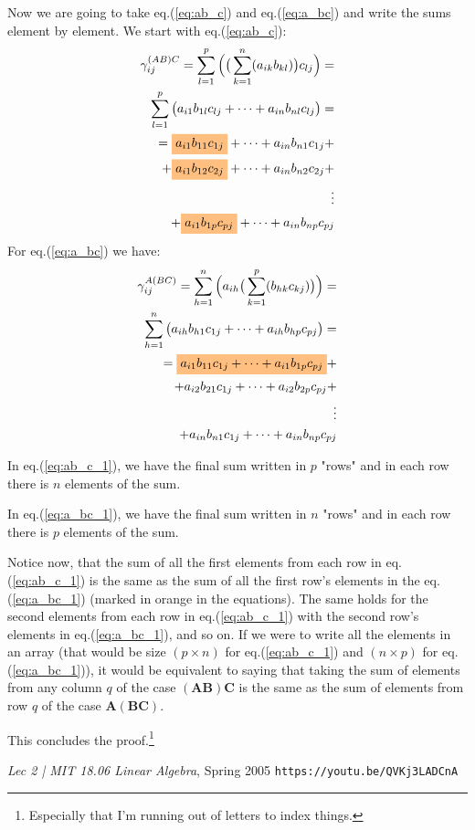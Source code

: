 \documentclass[10pt,twocolumn]{article}
\newcommand{\highlight}[1]{%
  \colorbox{orange!50}{$\displaystyle#1$}}
\begin{document}
Now we are going to take eq.(\ref{eq:ab_c}) and eq.(\ref{eq:a_bc}) and write the sums element by element.
We start with eq.(\ref{eq:ab_c}):
\begin{equation} \label{eq:ab_c_1}
\begin{split}
\gamma_{ij}^{(AB)C} = \sum_{l=1}^{p} \Big( \big( \sum_{k=1}^{n} (a_{ik} b_{kl}) \big) c_{lj} \Big) = \\
\sum_{l=1}^{p} \big( a_{i1} b_{1l} c_{lj} + \dots + a_{in} b_{nl} c_{lj} \big) = \\ 
= \highlight{a_{i1} b_{11} c_{1j}} + \dots + a_{in} b_{n1} c_{1j} + \\ 
+ \highlight{a_{i1} b_{12} c_{2j}} + \dots + a_{in} b_{n2} c_{2j} + \\ 
\vdots \\ 
+ \highlight{a_{i1} b_{1p} c_{pj}} + \dots + a_{in} b_{np} c_{pj}
\end{split}
\end{equation}
For eq.(\ref{eq:a_bc}) we have:
\begin{equation} \label{eq:a_bc_1}
\begin{split}
\gamma_{ij}^{A(BC)} = \sum_{h=1}^{n} \Big(  a_{ih} \big( \sum_{k=1}^{p} (b_{hk} c_{kj}) \big) \Big) = \\
 \sum_{h=1}^{n}  \big( a_{ih} b_{h1} c_{1j} + \dots + a_{ih} b_{hp} c_{pj}   \big) = \\
= \highlight{a_{i1} b_{11} c_{1j} + \dots + a_{i1} b_{1p} c_{pj}} + \\ 
+ a_{i2} b_{21} c_{1j} + \dots + a_{i2} b_{2p} c_{pj} + \\ 
\vdots \\ 
+ a_{in} b_{n1} c_{1j} + \dots + a_{in} b_{np} c_{pj}
\end{split}
\end{equation}

In eq.(\ref{eq:ab_c_1}), we have the final sum written in $p$ "rows" and in each row there is $n$ elements of the sum.

In eq.(\ref{eq:a_bc_1}), we have the final sum written in $n$ "rows" and in each row there is $p$ elements of the sum.

Notice now, that the sum of all the first elements from each row in eq.(\ref{eq:ab_c_1}) is the same as the sum of all the first row's elements in the eq.(\ref{eq:a_bc_1}) (marked in orange in the equations). The same holds for the second elements from each row in eq.(\ref{eq:ab_c_1}) with the second row's elements in eq.(\ref{eq:a_bc_1}), and so on. If we were to write all the elements in an array (that would be size $(p \times n)$ for eq.(\ref{eq:ab_c_1}) and $(n \times p)$ for eq.(\ref{eq:a_bc_1})), it would be equivalent to saying that taking the sum of elements from any column $q$ of the case $(\bm{A} \bm{B}) \bm{C}$ is the same as the sum of elements from row $q$ of the case $\bm{A} (\bm{B} \bm{C})$.

This concludes the proof.\footnote{Especially that I'm running out of letters to index things.}

\begin{thebibliography}{3}

\item \textit{Lec 2 | MIT 18.06 Linear Algebra}, Spring 2005 \verb|https://youtu.be/QVKj3LADCnA|

\end{thebibliography}
\end{document}
